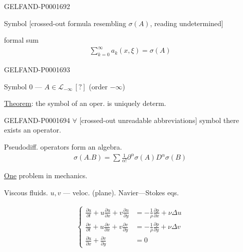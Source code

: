 \begin{GelfandAdjacentEvidence}{GELFAND-P000169}{2}

Symbol [crossed-out formula resembling $\sigma (A)$, reading undetermined]
\end{GelfandAdjacentEvidence}

formal sum
\begin{gather*}
\sum_{k=0}^{\infty}a_k (x,\xi)=\sigma (A)
\end{gather*}

\begin{GelfandAdjacentEvidence}{GELFAND-P000169}{3}

Symbol $0$ — $A\in\mathcal{L}_{-\infty}\, [?]$ (order $-\infty$)
\end{GelfandAdjacentEvidence}


\underline{Theorem}: the symbol of an oper. is uniquely determ.

\begin{GelfandAdjacentEvidence}{GELFAND-P000169}{4}
$\forall$ [crossed-out unreadable abbreviations] symbol there exists an operator.
\end{GelfandAdjacentEvidence}


Pseudodiff. operators form an algebra.
\begin{gather*}
\sigma (A. B)=\sum\frac{1}{\alpha!}
\partial^\alpha\sigma (A)D^\alpha\sigma (B)
\end{gather*}



\underline{One}  problem in mechanics.

Viscous fluids. $u, v$ — veloc. (plane). Navier—Stokes eqs.

\begin{gather*}
\left\{\begin{aligned}
\frac{\partial u}{\partial t}+u\frac{\partial u}{\partial x}
+v\frac{\partial u}{\partial y}
&=-\frac{1}{\rho}\frac{\partial p}{\partial x}+\nu\Delta u\\
\frac{\partial v}{\partial t}+u\frac{\partial v}{\partial x}
+v\frac{\partial v}{\partial y}
&=-\frac{1}{\rho}\frac{\partial p}{\partial y}+\nu\Delta v\\
\frac{\partial u}{\partial x}+\frac{\partial v}{\partial y}&=0
\end{aligned}\right.
\end{gather*}


